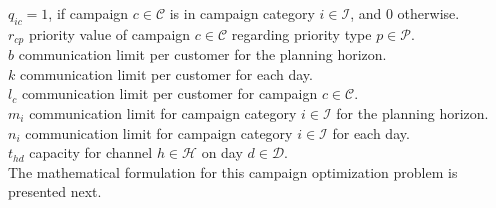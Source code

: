 \documentclass[11pt]{article}
\begin{document}
\begin{singlespace}
\noindent $q_{{i}{c}}=1$, if campaign $c \in \mathcal{C}$ is in campaign category $i \in \mathcal{I}$, and 0 otherwise.\\

\noindent $r_{{c}{p}}$ priority value of campaign $c \in \mathcal{C}$ regarding priority type $p \in \mathcal{P}$.\\

\noindent $b$ communication limit per customer for the planning horizon.\\

\noindent $k$ communication limit per customer for each day.\\

\noindent $l_{c}$ communication limit per customer for campaign $c \in \mathcal{C}$.\\

\noindent $m_{i}$ communication limit for campaign category $i \in \mathcal{I}$ for the planning horizon.\\

\noindent $n_{i}$ communication limit for campaign category $i \in \mathcal{I}$ for each day.\\

\noindent $t_{{h}{d}}$ capacity for channel $h \in \mathcal{H}$ on day $d \in \mathcal{D}$.\\

\noindent The mathematical formulation for this campaign optimization problem is presented next.
\end{singlespace}
\vspace{-0.5cm}
\end{document}
